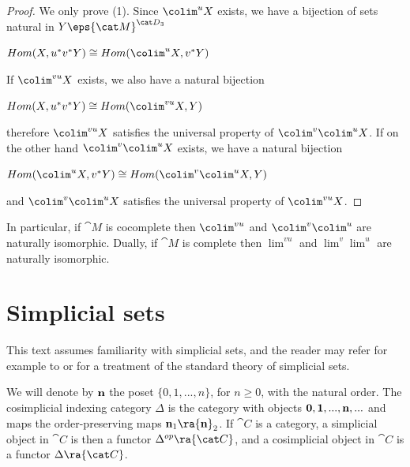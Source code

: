 \begin{proof}
We only prove (1). Since $\colim^u X$ exists, we have a bijection of sets natural in $Y \eps {\cat M}^{{\cat D}_3}$
\begin{center}
$Hom(X, u^*v^* Y) \cong Hom(\colim^u X, v^* Y)$ 
\end{center}
If $\colim^{vu} X$ exists, we also have a natural bijection
\begin{center}
$Hom(X, u^*v^* Y) \cong Hom(\colim^{vu} X, Y)$
\end{center}
therefore $\colim^{vu} X$ satisfies the universal property of $\colim^v \colim^u X$. If on the other hand $\colim^v \colim^u X$ exists, we have a natural bijection
\begin{center}
$Hom(\colim^u X, v^* Y) \cong Hom(\colim^v\colim^u X, Y)$
\end{center}
and $\colim^v \colim^u X$ satisfies the universal property of $\colim^{vu} X$. 
\end{proof}

In particular, if ${\cat M}$ is cocomplete then $\colim^{vu}$ and $\colim^v \colim^u$ are naturally isomorphic. Dually, if ${\cat M}$ is complete then $\lim^{vu}$ and $\lim^v \lim^u$ are naturally isomorphic.

\section{Simplicial sets}
\label{sec:simplindex}
This text assumes familiarity with simplicial sets, and the reader may refer for example to \cite{Goerss-Jardine} or \cite{Hovey} for a treatment of the standard theory of simplicial sets. 

We will denote by ${\bf n}$ the poset $\{0, 1, ... , n\}$, for $n \ge 0$, with the natural order. The cosimplicial indexing category $\Delta$\index{$\Delta$} is the category with objects ${\bf 0}, {\bf 1}, ..., {\bf n}, ...$ and maps the order-preserving maps ${\bf n}_1 \ra {\bf n}_2$. If ${\cat C}$ is a category, a simplicial object in ${\cat C}$ is then a functor $\Delta^{op} \ra {\cat C}$, and a cosimplicial object in ${\cat C}$ is a functor $\Delta \ra {\cat C}$.

